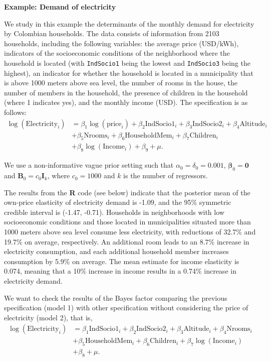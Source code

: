 \textbf{Example: Demand of electricity}

We study in this example the determinants of the monthly demand for electricity by Colombian households. The data consists of information from 2103 households, including the following variables: the average price (USD/kWh), indicators of the socioeconomic conditions of the neighborhood where the household is located (with \texttt{IndSocio1} being the lowest and \texttt{IndSocio3} being the highest), an indicator for whether the household is located in a municipality that is above 1000 meters above sea level, the number of rooms in the house, the number of members in the household, the presence of children in the household (where 1 indicates yes), and the monthly income (USD). The specification is as follows:
\begin{align*}
	\log(\text{Electricity}_i) & = \beta_1\log(\text{price}_i) + \beta_2\text{IndSocio1}_i + \beta_3\text{IndSocio2}_i + \beta_4\text{Altitude}_i \\
	& + \beta_5\text{Nrooms}_i + \beta_6\text{HouseholdMem}_i + \beta_7\text{Children}_i\\
	& + \beta_8\log(\text{Income}_i) + \beta_9 + \mu.
\end{align*}

We use a non-informative vague prior setting such that $\alpha_0=\delta_0=0.001$, $\bm{\beta}_0=\bm{0}$ and $\bm{B}_0=c_0\bm{I}_k$, where $c_0=1000$ and $k$ is the number of regressors. 

The results from the \textbf{R} code (see below) indicate that the posterior mean of the own-price elasticity of electricity demand is -1.09, and the 95\% symmetric credible interval is (-1.47, -0.71). Households in neighborhoods with low socioeconomic conditions and those located in municipalities situated more than 1000 meters above sea level consume less electricity, with reductions of 32.7\% and 19.7\% on average, respectively. An additional room leads to an 8.7\% increase in electricity consumption, and each additional household member increases consumption by 5.9\% on average. The mean estimate for income elasticity is 0.074, meaning that a 10\% increase in income results in a 0.74\% increase in electricity demand.

We want to check the results of the Bayes factor comparing the previous specification (model 1) with other specification without considering the price of electricity (model 2), that is,
\begin{align*}
	\log(\text{Electricity}_i) & = \beta_1\text{IndSocio1}_i + \beta_2\text{IndSocio2}_i + \beta_3\text{Altitude}_i + \beta_4\text{Nrooms}_i\\
	& + \beta_5\text{HouseholdMem}_i + \beta_6\text{Children}_i + \beta_7\log(\text{Income}_i)\\
	& + \beta_8 + \mu.
\end{align*}

